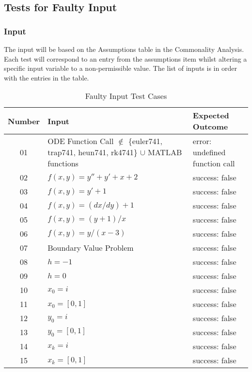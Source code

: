 \documentclass[12pt, titlepage]{article}
\begin{document}
\subsection{Tests for Faulty Input}

\subsubsection{Input}
		
The input will be based on the Assumptions table in the Commonality Analysis. Each test will correspond to an entry from the assumptions item whilst altering a specific input variable to a non-permissible value. The list of inputs is in order with the entries in the table.

\begin{table} [H]
  \caption{Faulty Input Test Cases}
  \label{Table:Table_FaultyInputs}  
\begin{tabular}{|c|p{8cm}|p{6cm}|}
  \hline	
  \textbf{Number} & \textbf{Input} &\textbf{Expected Outcome}\\
  \hline 
  01 & ODE Function Call $\mathbb{\notin}$ \{euler741, trap741, heun741, rk4741\} $\mathbb{\cup}$ 
  MATLAB functions & error: undefined function call\\ \hline
  02& $f(x, y) = y'' + y' + x + 2$ & success: false\\ \hline
  03& $f(x, y) = y' + 1$ & success: false\\ \hline
  04& $f(x, y) = (dx/dy) + 1$ & success: false\\ \hline
  05& $f(x, y) = (y + 1) / x$ & success: false\\ \hline
  06& $f(x, y) = y/(x-3)$ & success: false\\ \hline
  07& Boundary Value Problem & success: false\\ \hline
  08& $h = -1$ & success: false\\ \hline
  09& $h = 0$ & success: false\\ \hline
  10& $x_0 = i$ & success: false\\ \hline 
  11& $x_0 = [0, 1]$ & success: false\\ \hline 
  12& $y_0 = i$ & success: false\\ \hline 
  13& $y_0 = [0, 1]$ & success: false\\ \hline
  14& $x_k = i$ & success: false\\ \hline 
  15& $x_k = [0, 1]$ & success: false\\ \hline

\end{tabular}\\
\end{table}
\end{document}
